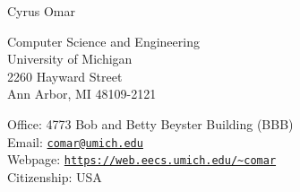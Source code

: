 \documentclass[10pt,letterpaper]{article}
\def\name{Cyrus Omar}
\renewenvironment{itemize}{
  \begin{list}{}{
    \setlength{\leftmargin}{1.25em}
    \setlength{\itemsep}{0.25em}
    \setlength{\parskip}{0pt}
    \setlength{\parsep}{0.2em}
  }
}{
  \end{list}
}
\begin{document}
{\LARGE \name}


\bigskip

\begin{minipage}[t]{0.495\textwidth}
  Computer Science and Engineering\\
  University of Michigan\\
  2260 Hayward Street\\
  Ann Arbor, MI 48109-2121 
\end{minipage}
\begin{minipage}[t]{0.495\textwidth}
  Office: 4773 Bob and Betty Beyster Building (BBB) \\
  Email: \href{mailto:comar@umich.edu}{\texttt{comar@umich.edu}} \\
  Webpage: \href{http://people.cs.uchicago.edu/~comar}{\texttt{https://web.eecs.umich.edu/\textasciitilde comar}} \\
  Citizenship: USA
\end{minipage}


\end{document}
